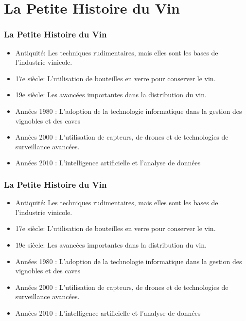 \documentclass{beamer}
\begin{document}
	\section{La Petite Histoire du Vin}

	\begin{frame}
	\frametitle{La Petite Histoire du Vin}
	\begin{itemize}
		\item Antiquité: Les techniques rudimentaires, mais elles sont les bases de l'industrie vinicole.
		\item 17e siècle: L'utilisation de bouteilles en verre pour conserver le vin. 
		\item 19e siècle: Les avancées importantes dans la distribution du vin.
		\item Années 1980 : L'adoption de la technologie informatique dans la gestion des vignobles et des caves
		\item Années 2000 : L'utilisation de capteurs, de drones et de technologies de surveillance avancées.
		\item Années 2010 : L'intelligence artificielle et l'analyse de données
	\end{itemize}
	
	\end{frame}


	\begin{frame}
	\frametitle{La Petite Histoire du Vin}
	\begin{itemize}
		\item \alert<1>{Antiquité: Les techniques rudimentaires, mais elles sont les bases de l'industrie vinicole.}
		\item \alert<2>{17e siècle: L'utilisation de bouteilles en verre pour conserver le vin. }
		\item \alert<3> {19e siècle: Les avancées importantes dans la distribution du vin.}
		\item  \alert<4>{Années 1980 : L'adoption de la technologie informatique dans la gestion des vignobles et des caves}
		\item  \alert<5>{Années 2000 : L'utilisation de capteurs, de drones et de technologies de surveillance avancées.}
		\item \alert<6>{Années 2010 : L'intelligence artificielle et l'analyse de données}

	\end{itemize}
	
\end{frame}
\end{document}
